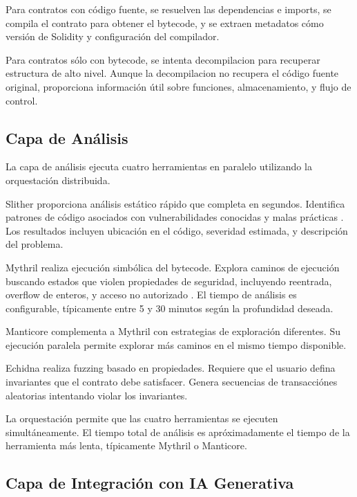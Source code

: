 \documentclass[12pt,a4paper,twoside]{book}
\begin{document}
Para contratos con código fuente, se resuelven las dependencias e imports, se compila el contrato para obtener el bytecode, y se extraen metadatos cómo versión de Solidity y configuración del compilador.

Para contratos sólo con bytecode, se intenta decompilacion para recuperar estructura de alto nivel. Aunque la decompilacion no recupera el código fuente original, proporciona información útil sobre funciones, almacenamiento, y flujo de control.

\subsection{Capa de Análisis}

La capa de análisis ejecuta cuatro herramientas en paralelo utilizando la orquestación distribuida.

Slither \cite{feist2019slither} proporciona análisis estático rápido que completa en segundos. Identifica patrones de código asociados con vulnerabilidades conocidas y malas prácticas \cite{atzei2017survey}. Los resultados incluyen ubicación en el código, severidad estimada, y descripción del problema.

Mythril \cite{consensys2019mythril} realiza ejecución simbólica del bytecode. Explora caminos de ejecución buscando estados que violen propiedades de seguridad, incluyendo reentrada, overflow de enteros, y acceso no autorizado \cite{luu2016oyente}. El tiempo de análisis es configurable, típicamente entre 5 y 30 minutos según la profundidad deseada.

Manticore \cite{mossberg2019manticore} complementa a Mythril con estrategias de exploración diferentes. Su ejecución paralela permite explorar más caminos en el mismo tiempo disponible.

Echidna \cite{echidna2020} realiza fuzzing basado en propiedades. Requiere que el usuario defina invariantes que el contrato debe satisfacer. Genera secuencias de transacciónes aleatorias intentando violar los invariantes.

La orquestación permite que las cuatro herramientas se ejecuten simultáneamente. El tiempo total de análisis es apróximadamente el tiempo de la herramienta más lenta, típicamente Mythril o Manticore.

\subsection{Capa de Integración con IA Generativa}
\end{document}
